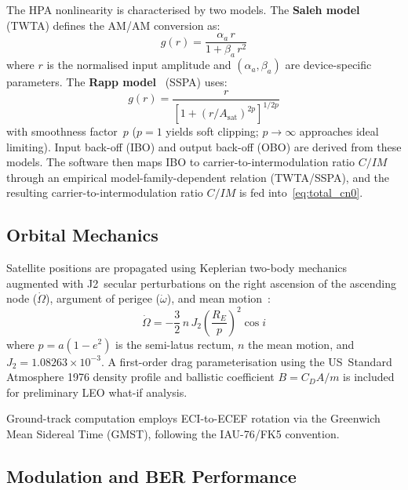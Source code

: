 \documentclass[conference]{IEEEtran}
\begin{document}
The HPA nonlinearity is characterised by two models.  The \textbf{Saleh
model}~\cite{saleh1981} (TWTA) defines the AM/AM conversion as:
\begin{equation}
  g(r) = \frac{\alpha_a\, r}{1 + \beta_a\, r^2}
  \label{eq:saleh}
\end{equation}
where $r$ is the normalised input amplitude and $(\alpha_a, \beta_a)$
are device-specific parameters.  The \textbf{Rapp model}~\cite{rapp1991}
(SSPA) uses:
\begin{equation}
  g(r) = \frac{r}{\left[1 + \left(r/A_\text{sat}\right)^{\!2p}\right]^{1/2p}}
  \label{eq:rapp}
\end{equation}
with smoothness factor~$p$ ($p=1$ yields soft clipping; $p \to \infty$
approaches ideal limiting).  Input back-off (IBO) and output back-off
(OBO) are derived from these models.  The software then maps IBO to
carrier-to-intermodulation ratio $C/IM$ through an empirical
model-family-dependent relation (TWTA/SSPA), and the resulting
carrier-to-intermodulation ratio $C/IM$ is fed into~\eqref{eq:total_cn0}.

\subsection{Orbital Mechanics}

Satellite positions are propagated using Keplerian two-body mechanics
augmented with J2~secular perturbations on the right ascension of the
ascending node ($\dot{\Omega}$), argument of perigee ($\dot{\omega}$),
and mean motion~\cite{vallado2013}:
\begin{equation}
  \dot{\Omega} = -\frac{3}{2}\,n\,J_2\!\left(\frac{R_E}{p}\right)^{\!2}
                  \cos i
  \label{eq:raan_dot}
\end{equation}
where $p = a(1-e^2)$ is the semi-latus rectum, $n$ the mean motion, and
$J_2 = 1.08263 \times 10^{-3}$.  A first-order drag parameterisation
using the US~Standard Atmosphere 1976 density profile and ballistic
coefficient $B = C_D A/m$ is included for preliminary LEO what-if
analysis.

Ground-track computation employs ECI-to-ECEF rotation via the Greenwich
Mean Sidereal Time (GMST), following the IAU-76/FK5 convention.

\subsection{Modulation and BER Performance}
\end{document}
